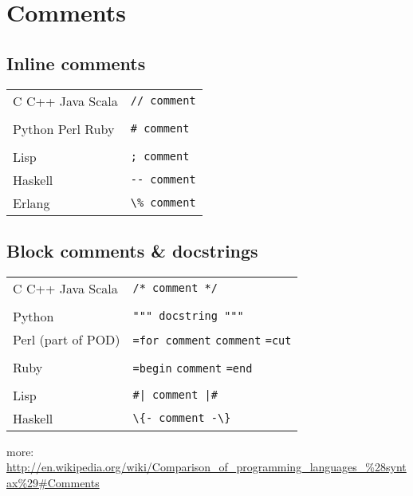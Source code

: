 \documentclass{article}
\begin{document}
\section{Comments}
\subsection{Inline comments}
\begin{longtabu} to 0.75\linewidth { X X }
	C \newline
    C++ \newline
    Java \newline
    Scala & \lstinline$// comment$ \\
	\\[-0.3em]
	Python \newline
    Perl \newline
    Ruby & \lstinline$# comment$ \\
	\\[-0.3em]
	Lisp & \lstinline$; comment$ \\
	Haskell & \lstinline$-- comment$ \\
	Erlang & \lstinline$\% comment$ \\
\end{longtabu}

\subsection{Block comments \& docstrings}
\begin{longtabu} to 0.75\linewidth { X X }
	C \newline
    C++ \newline
    Java \newline
    Scala & \lstinline$/* comment */$ \\
    \\[-0.3em]
	Python & \lstinline$""" docstring """$ \\
    Perl (part of POD) & \lstinline$=for comment$ \newline
    \lstinline$comment$ \newline
    \lstinline$=cut$  \\
	\\[-0.3em]
    Ruby & \lstinline$=begin$ \newline
    \lstinline$comment$ \newline
    \lstinline$=end$ \\
    \\[-0.3em]
	Lisp & \lstinline$#| comment |#$ \\
	Haskell & \lstinline$\{- comment -\}$ \\
\end{longtabu}
more: \url{http://en.wikipedia.org/wiki/Comparison_of_programming_languages_%28syntax%29#Comments}
\end{document}
